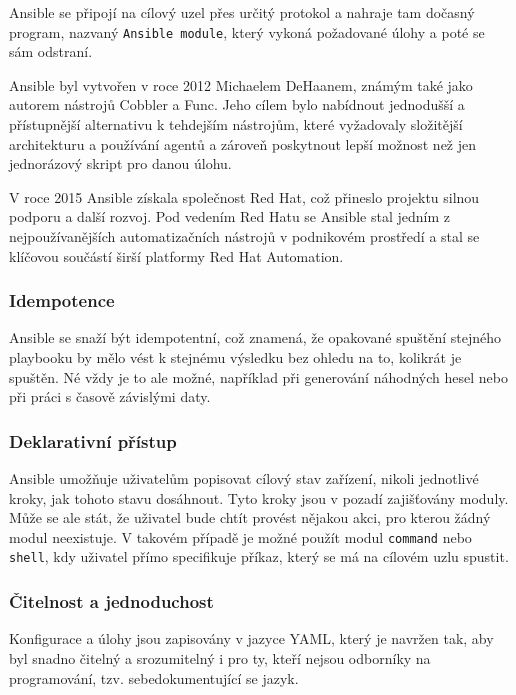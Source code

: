 Ansible se připojí na cílový uzel přes určitý protokol a nahraje tam dočasný program, nazvaný \texttt{Ansible module}, který vykoná požadované úlohy a poté se sám odstraní.

Ansible byl vytvořen v roce 2012 Michaelem DeHaanem, známým také jako autorem nástrojů Cobbler a Func. Jeho cílem bylo nabídnout 
jednodušší a přístupnější alternativu k tehdejším nástrojům, které vyžadovaly složitější architekturu a používání agentů a 
zároveň poskytnout lepší možnost než jen jednorázový skript pro danou úlohu.

V roce 2015 Ansible získala společnost Red Hat, což přineslo projektu silnou podporu a další rozvoj. Pod vedením Red Hatu se Ansible
 stal jedním z nejpoužívanějších automatizačních nástrojů v podnikovém prostředí a stal se klíčovou součástí širší platformy Red Hat Automation. \cite{hochstein2017ansible}

\subsubsection{Idempotence}
Ansible se snaží být idempotentní, což znamená, že opakované spuštění stejného playbooku by mělo vést k stejnému výsledku bez ohledu 
na to, kolikrát je spuštěn. Né vždy je to ale možné, například při generování náhodných hesel nebo při práci s časově závislými daty.

\subsubsection{Deklarativní přístup}
Ansible umožňuje uživatelům popisovat cílový stav zařízení, nikoli jednotlivé kroky, jak tohoto stavu dosáhnout. Tyto kroky jsou v pozadí
zajišťovány moduly. Může se ale stát, že uživatel bude chtít provést nějakou akci, pro kterou žádný modul neexistuje. 
V takovém případě je možné použít modul \texttt{command} nebo \texttt{shell}, kdy uživatel přímo specifikuje příkaz, který se má na cílovém uzlu spustit. 
\cite{hochstein2017ansible}

\subsubsection{Čitelnost a jednoduchost}
Konfigurace a úlohy jsou zapisovány v jazyce YAML, který je navržen tak, aby byl snadno čitelný a srozumitelný i pro ty, 
kteří nejsou odborníky na programování, tzv. sebedokumentující se jazyk. \cite{hochstein2017ansible}

